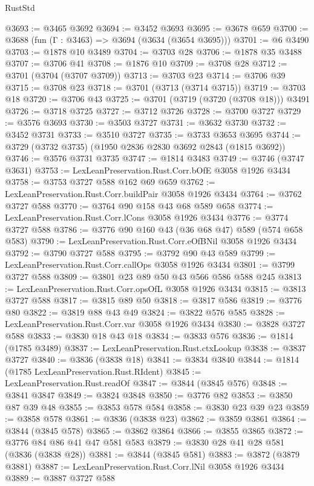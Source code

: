 \begin{lexlean}{RustStd}
\begin{coremodule}
@3693 := @3465 @3692
@3694 := @3452 @3693
@3695 := @3678 @659
@3700 := @3688 (fun (Γ : @3463) => @3694 (@3634 (@3654 @3695)))
@3701 := @6 @3490
@3703 := @1878 @10 @3489
@3704 := @3703 @28
@3706 := @1878 @35 @3488
@3707 := @3706 @41
@3708 := @1876 @10
@3709 := @3708 @28
@3712 := @3701 (@3704 (@3707 @3709))
@3713 := @3703 @23
@3714 := @3706 @39
@3715 := @3708 @23
@3718 := @3701 (@3713 (@3714 @3715))
@3719 := @3703 @18
@3720 := @3706 @43
@3725 := @3701 (@3719 (@3720 (@3708 @18))) @3491
@3726 := @3718 @3725
@3727 := @3712 @3726
@3728 := @3700 @3727
@3729 := @3576 @3693
@3730 := @3503 @3727
@3731 := @3632 @3730
@3732 := @3452 @3731
@3733 := @3510 @3727
@3735 := @3733 @3653 @3695
@3744 := @3729 (@3732 @3735) (@1950 @2836 @2830 @3692 @2843 (@1815 @3692))
@3746 := @3576 @3731 @3735
@3747 := @1814 @3483
@3749 := @3746 (@3747 @3631)
@3753 := LexLeanPreservation.Rust.Corr.bOfE @3058 @1926 @3434
@3758 := @3753 @3727 @588 @162 @69 @659
@3762 := LexLeanPreservation.Rust.Corr.buildPair @3058 @1926 @3434
@3764 := @3762 @3727 @588
@3770 := @3764 @90 @158 @43 @68 @589 @658
@3774 := LexLeanPreservation.Rust.Corr.lCons @3058 @1926 @3434
@3776 := @3774 @3727 @588
@3786 := @3776 @90 @160 @43 (@36 @68 @47) @589 (@574 @658 @583)
@3790 := LexLeanPreservation.Rust.Corr.eOfBNil @3058 @1926 @3434
@3792 := @3790 @3727 @588
@3795 := @3792 @90 @43 @589
@3799 := LexLeanPreservation.Rust.Corr.callOps @3058 @1926 @3434
@3801 := @3799 @3727 @588
@3809 := @3801 @23 @89 @50 @43 @566 @586 @588 @245
@3813 := LexLeanPreservation.Rust.Corr.opsOfL @3058 @1926 @3434
@3815 := @3813 @3727 @588
@3817 := @3815 @89 @50
@3818 := @3817 @586
@3819 := @3776 @80
@3822 := @3819 @88 @43 @49
@3824 := @3822 @576 @585
@3828 := LexLeanPreservation.Rust.Corr.var @3058 @1926 @3434
@3830 := @3828 @3727 @588
@3833 := @3830 @18 @43 @18
@3834 := @3833 @576
@3836 := @1814 (@1785 @3489)
@3837 := LexLeanPreservation.Rust.ctxLookup
@3838 := @3837 @3727
@3840 := @3836 (@3838 @18)
@3841 := @3834 @3840
@3844 := @1814 (@1785 LexLeanPreservation.Rust.RIdent)
@3845 := LexLeanPreservation.Rust.readOf
@3847 := @3844 (@3845 @576)
@3848 := @3841 @3847
@3849 := @3824 @3848
@3850 := @3776 @82
@3853 := @3850 @87 @39 @48
@3855 := @3853 @578 @584
@3858 := @3830 @23 @39 @23
@3859 := @3858 @578
@3861 := @3836 (@3838 @23)
@3862 := @3859 @3861
@3864 := @3844 (@3845 @578)
@3865 := @3862 @3864
@3866 := @3855 @3865
@3872 := @3776 @84 @86 @41 @47 @581 @583
@3879 := @3830 @28 @41 @28 @581 (@3836 (@3838 @28))
@3881 := @3844 (@3845 @581)
@3883 := @3872 (@3879 @3881)
@3887 := LexLeanPreservation.Rust.Corr.lNil @3058 @1926 @3434
@3889 := @3887 @3727 @588

\end{coremodule}
\end{lexlean}
